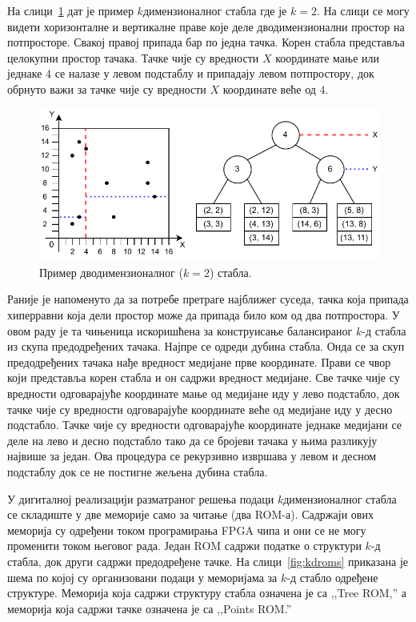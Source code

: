 \documentclass[master]{finthesis}
\newcommand*{\kdim}[1]{\texorpdfstring{$k$\Hyphdash}{k-}димензионал#1}
\newcommand*{\kd}{\texorpdfstring{$k$}{k}-д }
\begin{document}
На слици~\ref{fig:kdfig} дат је пример \kdim{ног} стабла где је $k = 2$. На слици се могу видети хоризонталне и вертикалне праве које деле дводимензионални простор на потпросторе. Свакој правој припада бар по једна тачка. Корен стабла представља целокупни простор тачака. Тачке чије су вредности $X$ координате мање или једнаке $4$ се налазе у левом подстаблу и припадају левом потпростору, док обрнуто важи за тачке чије су вредности $X$ координате веће од $4$.

\begin{figure}[h]
    \includegraphics[width=\linewidth]{slike/kd_fig}
    \caption{Пример дводимензионалног ($k = 2$) стабла.}
    \label{fig:kdfig}
\end{figure}

Раније је напоменуто да за потребе претраге најближег суседа, тачка која припада хиперравни која дели простор може да припада било ком од два потпростора. У овом раду је та чињеница искоришћена за конструисање балансираног \kd стабла из скупа предодређених тачака. Најпре се одреди дубина стабла. Онда се за скуп предодређених тачака нађе вредност медијане прве координате. Прави се чвор који представља корен стабла и он садржи вредност медијане. Све тачке чије су вредности одговарајуће координате мање од медијане иду у лево подстабло, док тачке чије су вредности одговарајуће координате веће од медијане иду у десно подстабло. Тачке чије су вредности одговарајуће координате једнаке медијани се деле на лево и десно подстабло тако да се бројеви тачака у њима разликују највише за један. Ова процедура се рекурзивно извршава у левом и десном подстаблу док се не постигне жељена дубина стабла.

У дигиталној реализацији разматраног решења подаци \kdim{ног} стабла се складиште у две меморије само за читање (два ROM-а). Садржаји ових меморија су одређени током програмирања FPGA чипа и они се не могу променити током његовог рада. Један ROM садржи податке о структури \kd стабла, док други садржи предодређене тачке. На слици~\ref{fig:kdroms} приказана је шема по којој су организовани подаци у меморијама за \kd стабло одређене структуре. Меморија која садржи структуру стабла означена је са ,,Tree ROM,'' а меморија која садржи тачке означена је са ,,Points ROM.'' 
\end{document}

